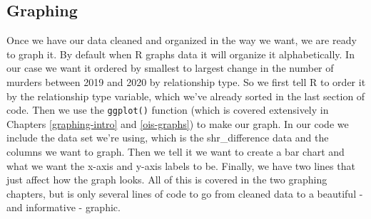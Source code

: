 \documentclass[
  a4paper,
]{krantz}
\makeatletter
\newenvironment{Shaded}{\begin{snugshade}}{\end{snugshade}}
\newcommand{\AttributeTok}[1]{\textcolor[rgb]{0.61,0.61,0.61}{#1}}
\newcommand{\FunctionTok}[1]{\textcolor[rgb]{0,0,0}{#1}}
\newcommand{\NormalTok}[1]{#1}
\newcommand{\OtherTok}[1]{\textcolor[rgb]{0.37,0.37,0.37}{#1}}
\newcommand{\SpecialCharTok}[1]{\textcolor[rgb]{0,0,0}{#1}}
\newcommand{\StringTok}[1]{\textcolor[rgb]{0.5,0.5,0.5}{#1}}
\newenvironment{kframe}{%
\medskip{}
\setlength{\fboxsep}{.8em}
 \def\at@end@of@kframe{}%
 \ifinner\ifhmode%
  \def\at@end@of@kframe{\end{minipage}}%
  \begin{minipage}{\columnwidth}%
 \fi\fi%
 \def\FrameCommand##1{\hskip\@totalleftmargin \hskip-\fboxsep
 \colorbox{shadecolor}{##1}\hskip-\fboxsep
     \hskip-\linewidth \hskip-\@totalleftmargin \hskip\columnwidth}%
 \MakeFramed {\advance\hsize-\width
   \@totalleftmargin\z@ \linewidth\hsize
   \@setminipage}}%
 {\par\unskip\endMakeFramed%
 \at@end@of@kframe}
\renewenvironment{Shaded}{\begin{kframe}}{\end{kframe}}
\makeatother
\begin{document}
\hypertarget{graphing}{%
\subsection{Graphing}\label{graphing}}

Once we have our data cleaned and organized in the way we
want, we are ready to graph it. By default when R graphs
data it will organize it alphabetically. In our case we want
it ordered by smallest to largest change in the number of
murders between 2019 and 2020 by relationship type. So we
first tell R to order it by the relationship type variable,
which we've already sorted in the last section of code. Then
we use the \texttt{ggplot()} function (which is covered
extensively in Chapters \ref{graphing-intro} and
\ref{ois-graphs}) to make our graph. In our code we include
the data set we're using, which is the shr\_difference data
and the columns we want to graph. Then we tell it we want to
create a bar chart and what we want the x-axis and y-axis
labels to be. Finally, we have two lines that just affect
how the graph looks. All of this is covered in the two
graphing chapters, but is only several lines of code to go
from cleaned data to a beautiful - and informative -
graphic.

\begin{Shaded}
\end{Shaded}
\end{document}
